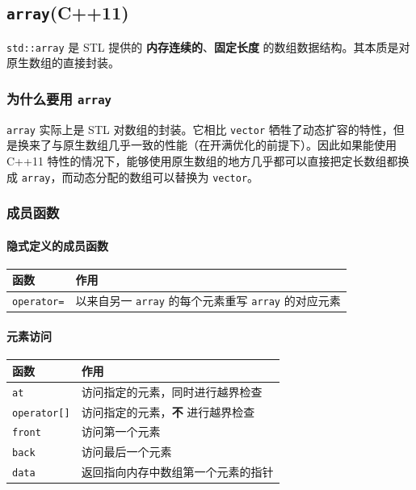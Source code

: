 \subsection{\texorpdfstring{\texttt{array}(C++11)}{array(C++11)}}\label{arrayc11}

\texttt{std::array} 是 STL 提供的 \textbf{内存连续的}、\textbf{固定长度} 的数组数据结构。其本质是对原生数组的直接封装。

\subsubsection{\texorpdfstring{为什么要用 \texttt{array}}{为什么要用 array}}\label{ux4e3aux4ec0ux4e48ux8981ux7528-array}

\texttt{array} 实际上是 STL 对数组的封装。它相比 \texttt{vector} 牺牲了动态扩容的特性，但是换来了与原生数组几乎一致的性能（在开满优化的前提下）。因此如果能使用 C++11 特性的情况下，能够使用原生数组的地方几乎都可以直接把定长数组都换成 \texttt{array}，而动态分配的数组可以替换为 \texttt{vector}。

\subsubsection{成员函数}\label{ux6210ux5458ux51fdux6570}

\paragraph{隐式定义的成员函数}\label{ux9690ux5f0fux5b9aux4e49ux7684ux6210ux5458ux51fdux6570}

{\def\LTcaptype{none} %
\begin{longtable}[]{@{}ll@{}}
\toprule\noalign{}
函数 & 作用 \\
\midrule\noalign{}
\endhead
\bottomrule\noalign{}
\endlastfoot
\texttt{operator=} & 以来自另一 \texttt{array} 的每个元素重写 \texttt{array} 的对应元素 \\
\end{longtable}
}

\paragraph{元素访问}\label{ux5143ux7d20ux8bbfux95ee-1}

{\def\LTcaptype{none} %
\begin{longtable}[]{@{}ll@{}}
\toprule\noalign{}
函数 & 作用 \\
\midrule\noalign{}
\endhead
\bottomrule\noalign{}
\endlastfoot
\texttt{at} & 访问指定的元素，同时进行越界检查 \\
\texttt{operator{[}{]}} & 访问指定的元素，\textbf{不} 进行越界检查 \\
\texttt{front} & 访问第一个元素 \\
\texttt{back} & 访问最后一个元素 \\
\texttt{data} & 返回指向内存中数组第一个元素的指针 \\
\end{longtable}
}

